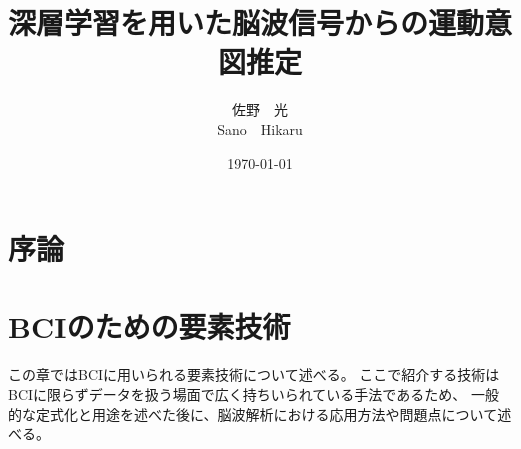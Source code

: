 \documentclass[a4paper,11truept, oneside, openany, report]{jsbook}
\title{深層学習を用いた脳波信号からの運動意図推定}
\author{佐野\ \ 光 \\ Sano\ \ Hikaru}
\date{\today}
\begin{document}
%


%
\maketitle
%
%
\frontmatter


% 
\setcounter{tocdepth}{2}
\tableofcontents
%
%
\mainmatter






\chapter{\mc 序論}



\chapter{{\rm BCI}{\mc のための要素技術}}
\label{chapter:BCIのための要素技術}
この章ではBCIに用いられる要素技術について述べる。
ここで紹介する技術はBCIに限らずデータを扱う場面で広く持ちいられている手法であるため、
一般的な定式化と用途を述べた後に、脳波解析における応用方法や問題点について述べる。




\end{document}
